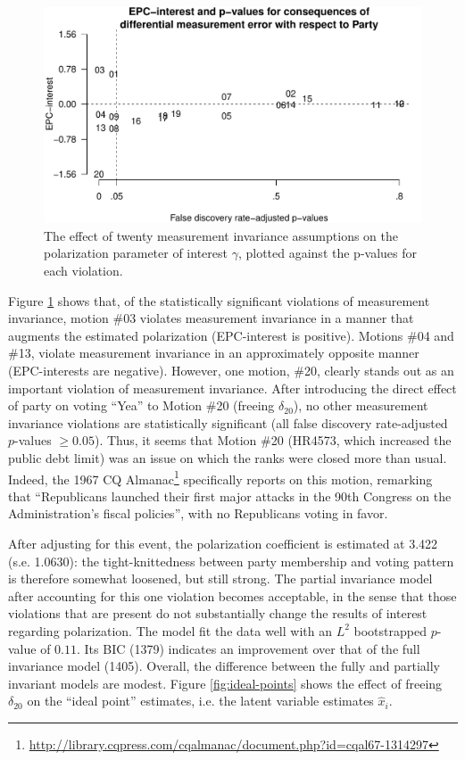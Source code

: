 \documentclass[12pt]{article}
\begin{document}
\begin{figure}\centering
\includegraphics[width=.9\textwidth]{../../outputs/EPC-interest.pdf}
\caption{The effect of twenty measurement invariance assumptions on the polarization parameter of interest $\gamma$, plotted against the p-values for each violation.}
\label{fig:epc-interest}
\end{figure}

Figure \ref{fig:epc-interest} shows that, of the statistically significant violations of measurement invariance, motion \#03 violates measurement invariance in a manner that augments the estimated polarization (EPC-interest is positive). Motions \#04 and \#13, violate measurement invariance in an approximately opposite manner (EPC-interests are negative). However, one motion, \#20, clearly stands out as an important violation of measurement invariance.
After introducing the direct effect of party on voting ``Yea'' to Motion \#20 (freeing $\delta_{20}$), no other measurement invariance violations are statistically significant (all false discovery rate-adjusted $p$-values $\geq 0.05$). Thus, it seems that Motion \#20 (HR4573, which increased the public debt limit) was an issue on which the ranks were closed more than usual. Indeed, the 1967 CQ Almanac\footnote{\url{http://library.cqpress.com/cqalmanac/document.php?id=cqal67-1314297}} specifically reports on this motion, remarking that ``Republicans launched their first major attacks in the 90th Congress on the Administration's fiscal policies'', with no Republicans voting in favor. 

After adjusting for this event, the polarization coefficient is estimated at 3.422 (s.e. 1.0630): the tight-knittedness between party membership and voting pattern is therefore somewhat loosened, but still strong.  The partial invariance model after accounting for this one violation becomes acceptable, in  the sense that those violations that are present do not substantially change the results of interest regarding polarization. The model fit the data well with an $L^2$ bootstrapped $p$-value of $0.11$. Its BIC (1379) indicates an improvement over that of the full invariance model (1405).  Overall, the difference between the fully and partially invariant models are modest. Figure \ref{fig:ideal-points} shows the effect of freeing $\delta_{20}$ on the ``ideal point'' estimates, i.e. the latent variable estimates $\hat{x}_i$. 
\end{document}
